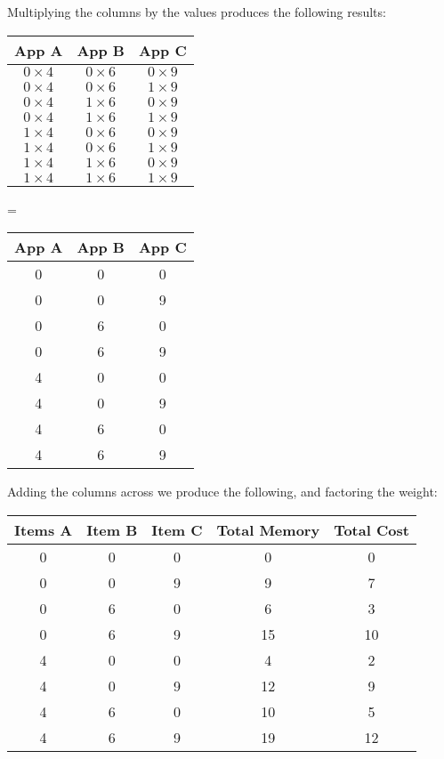 \documentclass{article}
\begin{document}
Multiplying the columns by the values produces the following results:

\begin{center}

    \begin{tabular}{|c|c|c|}
        \hline
        App A & App B & App C   \\ \hline
        $0 \times 4$ & $0 \times 6$ & $0 \times 9$ \\
        $0 \times 4$ & $0 \times 6$ & $1 \times 9$ \\
        $0 \times 4$ & $1 \times 6$ & $0 \times 9$ \\
        $0 \times 4$ & $1 \times 6$ & $1 \times 9$ \\
        $1 \times 4$ & $0 \times 6$ & $0 \times 9$ \\
        $1 \times 4$ & $0 \times 6$ & $1 \times 9$ \\
        $1 \times 4$ & $1 \times 6$ & $0 \times 9$ \\
        $1 \times 4$ & $1 \times 6$ & $1 \times 9$ \\
        \hline
    \end{tabular} \quad
    = \quad
    \begin{tabular}{|c|c|c|}
        \hline
        App A & App B & App C \\ \hline
        0 & 0 & 0\\
        0 & 0 & 9\\
        0 & 6 & 0\\
        0 & 6 & 9\\
        4 & 0 & 0\\
        4 & 0 & 9\\
        4 & 6 & 0\\
        4 & 6 & 9\\
        \hline
    \end{tabular}
\end{center}

Adding the columns across we produce the following, and factoring the weight:
\begin{center}
    \begin{tabular}{|c|c|c|c|c|}
        \hline
        Items A & Item B & Item C & Total Memory & Total Cost \\ \hline
        0 & 0 & 0 & 0 & 0\\
        0 & 0 & 9 & 9 & 7\\
        0 & 6 & 0 & 6 & 3\\
        0 & 6 & 9 & 15 & 10\\
        4 & 0 & 0 & 4 & 2\\
        4 & 0 & 9 & 12 & 9\\
        4 & 6 & 0 & 10 & 5\\
        4 & 6 & 9 & 19 & 12\\
        \hline
    \end{tabular}
\end{center}
\end{document}
